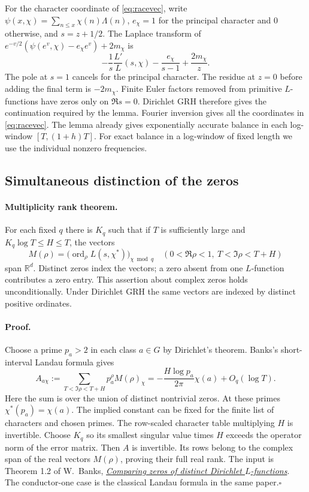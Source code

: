For the character coordinate of \eqref{eq:racevec}, write
$\psi(x,\chi)=\sum_{n\le x}\chi(n)\Lambda(n)$,
$e_\chi=1$ for the principal character and $0$ otherwise, and
$s=z+1/2$. The Laplace transform of
$e^{-v/2}(\psi(e^v,\chi)-e_\chi e^v)+2m_\chi$ is
\[
 -\frac{1}{s}\frac{L'}{L}(s,\chi)-\frac{e_\chi}{s-1}
                +\frac{2m_\chi}{z}.
\]
The pole at $s=1$ cancels for the principal character. The residue
at $z=0$ before adding the final term is $-2m_\chi$. Finite Euler
factors removed from primitive $L$-functions have zeros only on
$\Re s=0$. Dirichlet GRH therefore gives the continuation required
by the lemma. Fourier inversion gives all the coordinates in
\eqref{eq:racevec}. The lemma already gives exponentially accurate
balance in each log-window $[T,(1+h)T]$.
For exact balance in a log-window of fixed length we use the
individual nonzero frequencies.

\subsection{Simultaneous distinction of the zeros}

\paragraph{Multiplicity rank theorem.}
For each fixed $q$ there is $K_q$ such that if $T$ is sufficiently
large and $K_q\log T\leq H\leq T$, the vectors
\[
 M(\rho)=\big(\operatorname{ord}_\rho L(s,\chi^*)\big)_{\chi\bmod q}
 \quad (0<\Re\rho<1,\ T<\Im\rho<T+H)
\]
span $\mathbb R^d$. Distinct zeros index the vectors; a zero absent
from one $L$-function contributes a zero entry. This assertion about
complex zeros holds unconditionally. Under Dirichlet GRH the same
vectors are indexed by distinct positive ordinates.

\paragraph{Proof.}
Choose a prime $p_a>2$ in each class $a\in G$ by Dirichlet's theorem.
Banks's short-interval Landau formula gives
\[
 A_{a\chi}:=\sum_{T<\Im\rho<T+H}p_a^\rho M(\rho)_\chi
  =-\frac{H\log p_a}{2\pi}\chi(a)+O_q(\log T).
\]
Here the sum is over the union of distinct nontrivial zeros. At these
primes $\chi^*(p_a)=\chi(a)$. The implied constant can be fixed for
the finite list of characters and chosen primes. The row-scaled
character table multiplying $H$ is invertible. Choose $K_q$ so its
smallest singular value times $H$ exceeds the operator norm of the
error matrix. Then $A$ is invertible. Its rows belong to the complex
span of the real vectors $M(\rho)$, proving their full real rank.
The input is Theorem 1.2 of W.~Banks,
\href{https://arxiv.org/abs/2302.07073}{\emph{Comparing zeros of distinct
Dirichlet $L$-functions}}. The conductor-one case is the classical
Landau formula in the same paper.\hfill$\square$

